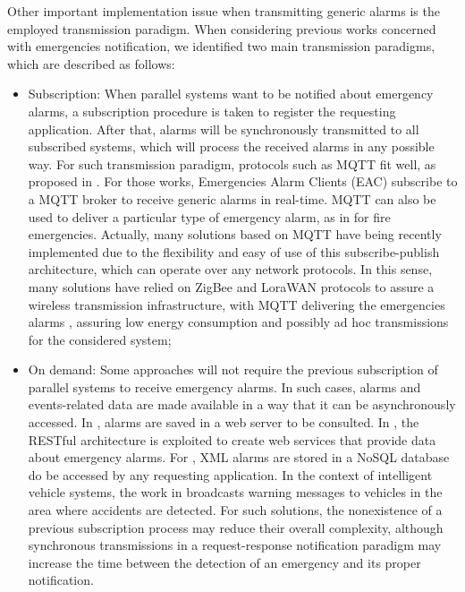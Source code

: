 \begin{refsection}
Other important implementation issue when transmitting generic alarms is the employed transmission paradigm. When considering previous works concerned with emergencies notification, we identified two main transmission paradigms, which are described as follows:

\begin{itemize}
    \item Subscription: When parallel systems want to be notified about emergency alarms, a subscription procedure is taken to register the requesting application. After that, alarms will be synchronously transmitted to all subscribed systems, which will process the received alarms in any possible way. For such transmission paradigm, protocols such as MQTT fit well, as proposed in \cite{emergenciesmetric2,emergenciesmetric3}. For those works, Emergencies Alarm Clients (EAC) subscribe to a MQTT broker to receive generic alarms in real-time. MQTT can also be used to deliver a particular type of emergency alarm, as in \cite{iotFire3,iotmqtt} for fire emergencies. Actually, many solutions based on MQTT have being recently implemented due to the flexibility and easy of use of this subscribe-publish architecture, which can operate over any network protocols. In this sense, many solutions have relied on ZigBee and LoraWAN protocols to assure a wireless transmission infrastructure, with MQTT delivering the emergencies alarms \cite{iotFire3,lora2,iotmqtt2}, assuring low energy consumption and possibly ad hoc transmissions for the considered system;
    
    \item On demand: Some approaches will not require the previous subscription of parallel systems to receive emergency alarms. In such cases, alarms and events-related data are made available in a way that it can be asynchronously accessed. In \cite{emergenciesmetric5}, alarms are saved in a web server to be consulted. In \cite{iotgadget1}, the RESTful architecture is exploited to create web services that provide data about emergency alarms. For \cite{emergenciesxml2}, 
    XML alarms are stored in a NoSQL database do be accessed by any requesting application. In the context of intelligent vehicle systems, the work in \cite{citiesvehicles3} broadcasts warning messages to vehicles in the area where accidents are detected. For such solutions, the nonexistence of a previous subscription process may reduce their overall complexity, although synchronous transmissions in a request-response notification paradigm may increase the time between the detection of an emergency and its proper notification.  
\end{itemize}


\end{refsection}
